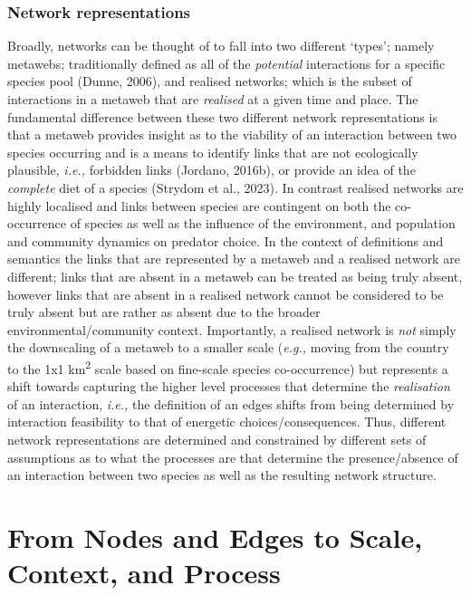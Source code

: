 \documentclass[
]{article}
\begin{document}
\subsubsection{Network representations}\label{network-representations}

Broadly, networks can be thought of to fall into two different `types';
namely metawebs; traditionally defined as all of the \emph{potential}
interactions for a specific species pool (Dunne, 2006), and realised
networks; which is the subset of interactions in a metaweb that are
\emph{realised} at a given time and place. The fundamental difference
between these two different network representations is that a metaweb
provides insight as to the viability of an interaction between two
species occurring and is a means to identify links that are not
ecologically plausible, \emph{i.e.,} forbidden links (Jordano, 2016b),
or provide an idea of the \emph{complete} diet of a species (Strydom et
al., 2023). In contrast realised networks are highly localised and links
between species are contingent on both the co-occurrence of species as
well as the influence of the environment, and population and community
dynamics on predator choice. In the context of definitions and semantics
the links that are represented by a metaweb and a realised network are
different; links that are absent in a metaweb can be treated as being
truly absent, however links that are absent in a realised network cannot
be considered to be truly absent but are rather as absent due to the
broader environmental/community context. Importantly, a realised network
is \emph{not} simply the downscaling of a metaweb to a smaller scale
(\emph{e.g.,} moving from the country to the 1x1 km\textsuperscript{2}
scale based on fine-scale species co-occurrence) but represents a shift
towards capturing the higher level processes that determine the
\emph{realisation} of an interaction, \emph{i.e.,} the definition of an
edges shifts from being determined by interaction feasibility to that of
energetic choices/consequences. Thus, different network representations
are determined and constrained by different sets of assumptions as to
what the processes are that determine the presence/absence of an
interaction between two species as well as the resulting network
structure.

\section{From Nodes and Edges to Scale, Context, and
Process}\label{sec-process}
\end{document}
